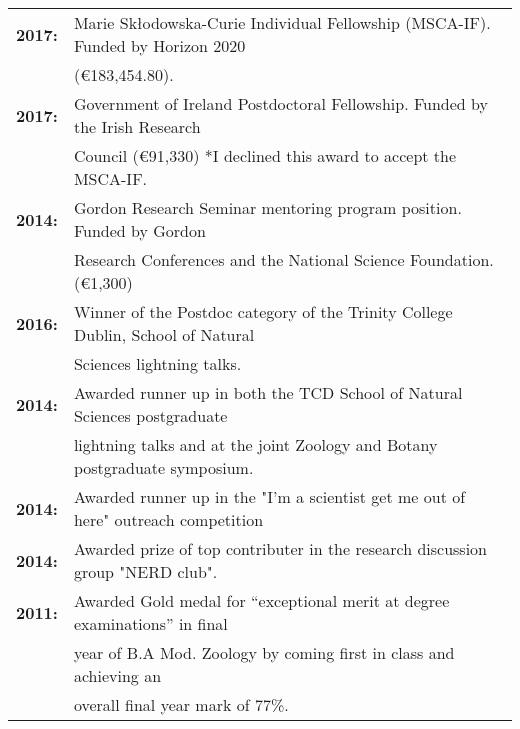 \documentclass[10pt,a4paper]{article}
\begin{document}
\begin{tabular}{ll}
\textbf{2017:} & Marie Sk\l{}odowska-Curie Individual Fellowship (MSCA-IF). Funded by Horizon 2020\\
& (\euro 183,454.80).\\
\textbf{2017:} & Government of Ireland Postdoctoral Fellowship. Funded by the Irish Research\\
& Council (\euro 91,330) *I declined this award to accept the MSCA-IF.\\
\textbf{2014:} & Gordon Research Seminar mentoring program position. Funded by Gordon\\
& Research Conferences and the National Science Foundation. (\euro 1,300)\\
\textbf{2016:} & Winner of the Postdoc category of the Trinity College Dublin, School of Natural\\
& Sciences lightning talks.\\
\textbf{2014:} & Awarded runner up in both the TCD School of Natural Sciences postgraduate\\
& lightning talks and at the joint Zoology and Botany postgraduate symposium.\\
\textbf{2014:} & Awarded runner up in the "I'm a scientist get me out of here" outreach competition\\
\textbf{2014:} & Awarded prize of top contributer in the research discussion group "NERD club".\\
\textbf{2011:} & Awarded Gold medal for “exceptional merit at degree examinations” in final\\
& year of B.A Mod. Zoology by coming first in class and achieving an\\
& overall final year mark of 77\%.\\
\end{tabular}

\bigskip


\end{document}
